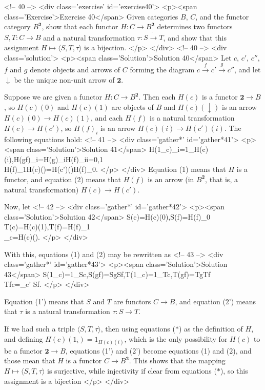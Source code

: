 <!-- 40 -->
<div class='exercise' id='exercise40'>
<p><span class='Exercise'>Exercise 40</span>
Given categories $B$, $C$, and the functor category $B^\mathbf{2}$, show that each functor $H:C\to B^\mathbf{2}$ determines two functors $S,T:C\to B$ and a natural transformation $\tau:S\dot{\to} T$, and show that this assignment $H\mapsto\langle S,T,\tau\rangle$ is a bijection.
</p>
</div>
<!-- 40 -->
<div class='solution'>
<p><span class='Solution'>Solution 40</span>
Let $c$, $c'$, $c''$, $f$ and $g$ denote objects and arrows of $C$ forming the diagram $c\overset{f}{\to}c'\overset{g}{\to}c''$, and let $\downarrow$ be the unique non-unit arrow of $\mathbf{2}$.

Suppose we are given a functor $H:C\to B^\mathbf{2}$. Then each $H(c)$ is a functor $\mathbf{2}\to B$, so $H(c)(0)$ and $H(c)(1)$ are objects of $B$ and $H(c)(\downarrow)$ is an arrow $H(c)(0)\to H(c)(1)$, and each $H(f)$ is a natural transformation $H(c)\to H(c')$, so $H(f)_i$ is an arrow $H(c)(i)\to H(c')(i)$. The following equations hold:
<!-- 41 -->
<div class='gather*' id='gather*41'>
<p><span class='Solution'>Solution 41</span>
H(1_c)_i=1_{H(c)(i)},\quad H(g\circ f)_i=H(g)_i\circ H(f)_i\qquad i=0,1\\
H(f)_1\circ H(c)(\downarrow)=H(c')(\downarrow)\circ H(f)_0.
</p>
</div>
Equation (1) means that $H$ is a functor, and equation (2) means that $H(f)$ is an arrow (in $B^\mathbf{2}$, that is, a natural transformation) $H(c)\to H(c')$.

Now, let
<!-- 42 -->
<div class='gather*' id='gather*42'>
<p><span class='Solution'>Solution 42</span>
S(c)=H(c)(0),\quad S(f)=H(f)_0\\
T(c)=H(c)(1),\quad T(f)=H(f)_1\tag{$*$}\\
\tau_c=H(c)(\downarrow).
</p>
</div>

With this, equations (1) and (2) may be rewritten as
<!-- 43 -->
<div class='gather*' id='gather*43'>
<p><span class='Solution'>Solution 43</span>
S(1_c)=1_{Sc},\quad S(g\circ f)=Sg\circ Sf,\quad T(1_c)=1_{Tc},\quad T(g\circ f)=Tg\circ Tf\\
Tf\circ\tau c=\tau_{c'} Sf.
</p>
</div>

Equation (1') means that $S$ and $T$ are functors $C\to B$, and equation (2') means that $\tau$ is a natural transformation $\tau:S\to T$.

If we had such a triple $\langle S,T,\tau\rangle$, then using equations ($*$) as the definition of $H$, and defining $H(c)(1_i)=1_{H(c)(i)}$, which is the only possibility for $H(c)$ to be a functor $\mathbf{2}\to B$, equations (1') and (2') become equations (1) and (2), and those mean that $H$ is a functor $C\to B^\mathbf{2}$. This shows that the mapping $H\mapsto\langle S,T,\tau\rangle$ is surjective, while injectivity if clear from equations ($*$), so this assignment is a bijection
</p>
</div>

